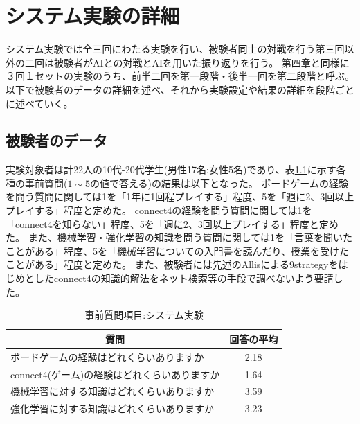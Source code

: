 \chapter{システム実験の詳細}
\label{chap:system}
システム実験では全三回にわたる実験を行い、被験者同士の対戦を行う第三回以外の二回は被験者がAIとの対戦とAIを用いた振り返りを行う。
第四章と同様に３回１セットの実験のうち、前半二回を第一段階・後半一回を第二段階と呼ぶ。
以下で被験者のデータの詳細を述べ、それから実験設定や結果の詳細を段階ごとに述べていく。
\section{被験者のデータ}
実験対象者は計22人の10代-20代学生(男性17名:女性5名)であり、表\ref{table:before}に示す各種の事前質問($1\sim5$の値で答える)の結果は以下となった。
ボードゲームの経験を問う質問に関しては1を「1年に1回程プレイする」程度、5を「週に2、3回以上プレイする」程度と定めた。
connect4の経験を問う質問に関しては1を「connect4を知らない」程度、5を「週に2、3回以上プレイする」程度と定めた。
また、機械学習・強化学習の知識を問う質問に関しては1を「言葉を聞いたことがある」程度、5を「機械学習についての入門書を読んだり、授業を受けたことがある」程度と定めた。
また、被験者には先述のAllis\cite{allis}による9strategyをはじめとしたconnect4の知識的解法をネット検索等の手段で調べないよう要請した。
\begin{table}[H]
    \caption{事前質問項目:システム実験}
    \label{table:before}
	\scriptsize
    \begin{tabular}{l||c}
        \multicolumn{1}{c|}{質問} & 回答の平均\\ \hline \hline
        ボードゲームの経験はどれくらいありますか & 2.18\\
        connect4(ゲーム)の経験はどれくらいありますか& 1.64\\\hline
        機械学習に対する知識はどれくらいありますか& 3.59\\
        強化学習に対する知識はどれくらいありますか& 3.23\\
    \end{tabular}
    
\end{table}
